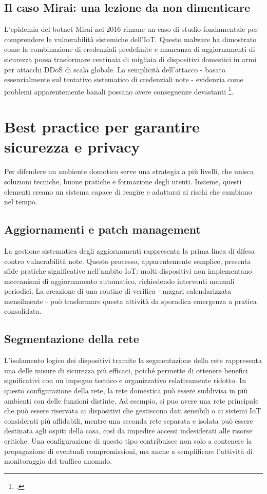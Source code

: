 \subsection{Il caso Mirai: una lezione da non dimenticare}

L'epidemia del botnet Mirai nel 2016 rimane un caso di studio fondamentale per comprendere le vulnerabilità sistemiche dell'IoT. Questo malware ha dimostrato come la combinazione di credenziali predefinite e mancanza di aggiornamenti di sicurezza possa trasformare centinaia di migliaia di dispositivi domestici in armi per attacchi DDoS di scala globale. La semplicità dell'attacco - basato essenzialmente sul tentativo sistematico di credenziali note - evidenzia come problemi apparentemente banali possano avere conseguenze devastanti \footcite{miraiBotnet}.

\section{Best practice per garantire sicurezza e privacy}

Per difendere un ambiente domotico serve una strategia a più livelli, che unisca soluzioni tecniche, buone pratiche e formazione degli utenti. Insieme, questi elementi creano un sistema capace di reagire e adattarsi ai rischi che cambiano nel tempo.

\subsection{Aggiornamenti e patch management}

La gestione sistematica degli aggiornamenti rappresenta la prima linea di difesa contro vulnerabilità note. Questo processo, apparentemente semplice, presenta sfide pratiche significative nell'ambito IoT: molti dispositivi non implementano meccanismi di aggiornamento automatico, richiedendo interventi manuali periodici. La creazione di una routine di verifica - magari calendarizzata mensilmente - può trasformare questa attività da sporadica emergenza a pratica consolidata.

\subsection{Segmentazione della rete}

L’isolamento logico dei dispositivi tramite la segmentazione della rete rappresenta una delle misure di sicurezza più efficaci, poiché permette di ottenere benefici significativi con un impegno tecnico e organizzativo relativamente ridotto. In questo configurazione della rete, la rete domestica può essere suddivisa in più ambienti con delle funzioni distinte. Ad esempio, si puo avere una rete principale che può essere riservata ai dispositivi che gestiscono dati sensibili o ai sistemi IoT considerati più affidabili, mentre una seconda rete separata e isolata può essere destinata agli ospiti della casa, così da impedire accessi indesiderati alle risorse critiche. Una configurazione di questo tipo contribuisce non solo a contenere la propagazione di eventuali compromissioni, ma anche a semplificare l’attività di monitoraggio del traffico anomalo.

